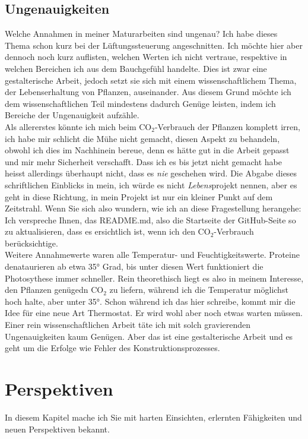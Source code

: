 \documentclass[12pt,titlepage,a4paper]{article}
\begin{document}
\subsection{Ungenauigkeiten}
Welche Annahmen in meiner Maturarbeiten sind ungenau? Ich habe dieses Thema schon kurz bei der Lüftungssteuerung angeschnitten. Ich möchte hier aber dennoch noch kurz auflisten, welchen Werten ich nicht vertraue, respektive in welchen Bereichen ich aus dem Bauchgefühl handelte. Dies ist zwar eine gestalterische Arbeit, jedoch setzt sie sich mit einem wissenschaftlichem Thema, der Lebenserhaltung von Pflanzen, auseinander. Aus diesem Grund möchte ich dem wissenschaftlichen Teil mindestens dadurch Genüge leisten, indem ich Bereiche der Ungenauigkeit aufzähle.\\ Als allererstes könnte ich mich beim CO$ _{2} $-Verbrauch der Pflanzen komplett irren, ich habe mir schlicht die Mühe nicht gemacht, diesen Aspekt zu behandeln, obwohl ich dies im Nachhinein bereue, denn es hätte gut in die Arbeit gepasst und mir mehr Sicherheit verschafft. Dass ich es bis jetzt nicht gemacht habe heisst allerdings überhaupt nicht, dass es \textit{nie} geschehen wird. Die Abgabe dieses schriftlichen Einblicks in mein, ich würde es nicht \textit{Lebens}projekt nennen, aber es geht in diese Richtung, in mein Projekt ist nur ein kleiner Punkt auf dem Zeitstrahl. Wenn Sie sich also wundern, wie ich an diese Fragestellung herangehe: Ich verspreche Ihnen, das README.md, also die Startseite der GitHub-Seite so zu aktualisieren, dass es ersichtlich ist, wenn ich den CO$ _{2} $-Verbrauch berücksichtige.\\ Weitere Annahmewerte waren alle Temperatur- und Feuchtigkeitswerte. Proteine denataurieren ab etwa 35° Grad, bis unter diesen Wert funktioniert die Photosythese immer schneller. Rein theorethisch liegt es also in meinem Interesse, den Pflanzen genügedn CO$ _{2} $ zu liefern, während ich die Temperatur möglichst hoch halte, aber unter 35°. Schon während ich das hier schreibe, kommt mir die Idee für eine neue Art Thermostat. Er wird wohl aber noch etwas warten müssen. Einer rein wissenschaftlichen Arbeit täte ich mit solch gravierenden Ungenauigkeiten kaum Genügen. Aber das ist eine gestalterische Arbeit und es geht um die Erfolge wie Fehler des Konstruktionsprozesses.



\section{Perspektiven}
In diesem Kapitel mache ich Sie mit harten Einsichten, erlernten Fähigkeiten und neuen Perspektiven bekannt.
\end{document}
